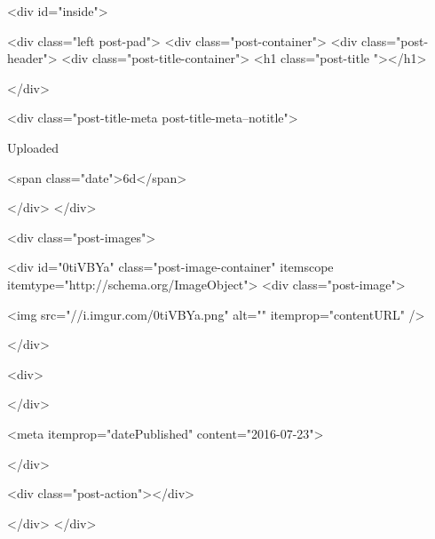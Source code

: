         <div id="inside">
        
        <div class="left post-pad">
            <div class="post-container">
                <div class="post-header">
                    <div class="post-title-container">
                                                    <h1 class="post-title "></h1>
                        
                    </div>

                    <div class="post-title-meta post-title-meta--notitle">
                        

                        
                                                    
                            Uploaded
                        

                                                    <span class="date">6d</span>
                        

                        
                        
                    </div>
                </div>

                <div class="post-images">

                                    
                    
                    

                    <div id="0tiVBYa" class="post-image-container" itemscope itemtype="http://schema.org/ImageObject">
                        <div class="post-image">
    

                        <img src="//i.imgur.com/0tiVBYa.png" alt="" itemprop="contentURL" />
        
    
</div>


                        <div>
                            
                        </div>

                                                    <meta itemprop="datePublished" content="2016-07-23">
                        

                        
                    </div>
                

                

                

                <div class="post-action"></div>

                
                </div>
            </div>

